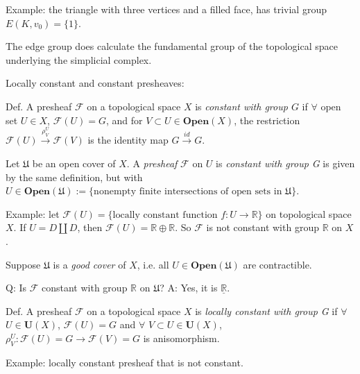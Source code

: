\documentclass{article}
\theoremstyle{mystyle}
\theoremstyle{remark}
\numberwithin{equation}{section}
\begin{document}
Example: the triangle with three vertices and a filled face, has trivial group $E(K,v_0) = \{1\}$. 

The edge group does calculate the fundamental group of the topological space underlying the simplicial complex.

Locally constant and constant presheaves:

Def. A presheaf $\mathcal{F}$ on a topological space $X$ is \emph{constant with group $G$} if $\forall $ open set $U \in X$, $\mathcal{F}(U)=G$, and for $V\subset U\in \mathbf{Open}(X)$, the restriction $\mathcal{F}(U)\xrightarrow{\rho^U_V} \mathcal{F}(V)$ is the identity map $G\xrightarrow {id}G$. 


Let $\mathfrak{U}$ be an open cover of $X$. A \emph{presheaf} $\mathcal{F}$ on $U$ is \emph{constant with group G} is given by the same definition, but with $U\in \mathbf{Open}(\mathfrak{U}) := \{\text{nonempty finite intersections of open sets in }\mathfrak{U}\}$. 

Example: let $\mathcal{F}(U) = \{\text{locally constant function }f\colon U\rightarrow \mathbb{R}\}$ on topological space $X$. If $U = D\amalg D$, then $\mathcal{F}(U) = \mathbb{R}\oplus \mathbb{R}$. So $\mathcal{F}$ is not constant with group $\mathbb{R}$ on $X$. 

Suppose $\mathfrak{U}$ is a \emph{good cover} of $X$, i.e. all $U\in \mathbf{Open}(\mathfrak{U})$ are contractible.

Q: Is $\mathcal{F}$ constant with group $\mathbb{R}$ on $\mathfrak{U}$? A: Yes, it is $\underline{\mathbb{R}}$. 

Def. A presheaf $\mathcal{F}$ on a topological space $X$ is \emph{locally constant with group G} if $\forall$ $U\in \mathbf{U}(X)$, $\mathcal{F}(U) = G$ and $\forall$ $V\subset U\in \mathbf{U}(X)$, $\rho^U_V\colon \mathcal{F}(U)=G\rightarrow \mathcal{F}(V)=G$ is anisomorphism.


Example: locally constant presheaf that is not constant.
\end{document}
